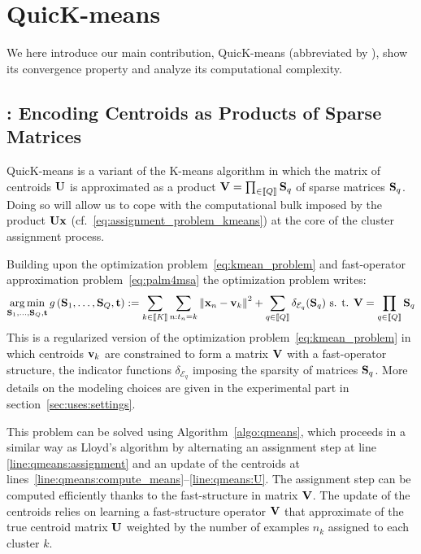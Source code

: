 
\section{QuicK-means}
\label{sec:contribution}

We here introduce our main contribution, QuicK-means (abbreviated by \qkmeans), 
show its convergence property and analyze its computational complexity.

\subsection{\qkmeans: Encoding Centroids as Products of Sparse Matrices}

QuicK-means is a variant of the K-means algorithm in which the matrix of centroids ${\mathbf{U}}$
is approximated as a product ${\mathbf{V}}=\prod_{\in\left \llbracket Q\right \rrbracket}{\mathbf{S}}_q$ of sparse matrices ${\mathbf{S}}_q$.
Doing so will allow us to cope with the computational bulk imposed by the product ${\mathbf{U}}{\mathbf{x}}$
(cf.~\eqref{eq:assignment_problem_kmeans}) at the core of the cluster assignment process.

Building upon the \kmeans optimization problem~\eqref{eq:kmean_problem} and fast-operator approximation problem~\eqref{eq:palm4msa} the \qkmeans optimization problem 
writes:
%
\begin{align}
\label{eq:qmean_problem}
 \operatorname*{arg\,min}_{{\mathbf{S}}_1, \ldots, {\mathbf{S}}_{Q}, {\mathbf{t}}} g\left({\mathbf{S}}_1, \ldots, {\mathbf{S}}_{Q}, {\mathbf{t}}\right)
    := \sum_{k\in\left \llbracket K\right \rrbracket}\sum_{n: t_n = k} \left\|{\mathbf{x}}_n -{\mathbf{v}}_k\right\|^2 + \sum_{q\in\left \llbracket Q\right \rrbracket} \delta_{\mathcal{E}_q}({\mathbf{S}}_q) \text{ s. t. } {\mathbf{V}} = \prod_{q\in\left \llbracket Q\right \rrbracket}{\mathbf{S}}_q
\end{align}
%
This is a regularized version of the \kmeans optimization problem~\eqref{eq:kmean_problem} in which centroids ${\mathbf{v}}_k$ are constrained to form a matrix ${\mathbf{V}}$ with a fast-operator structure, the indicator functions $\delta_{\mathcal{E}_q}$ imposing the sparsity of matrices ${\mathbf{S}}_q$.
More details on the modeling choices are given in the experimental part in section~\ref{sec:uses:settings}.

This problem can be solved using Algorithm~\ref{algo:qmeans},
which proceeds in a similar way as Lloyd's algorithm by alternating an assignment step at line \ref{line:qmeans:assignment} and an update of the centroids at lines~\ref{line:qmeans:compute_means}--\ref{line:qmeans:U}. The assignment step can be computed efficiently thanks to the fast-structure in matrix ${\mathbf{V}}$. The update of the centroids relies on learning a fast-structure operator ${\mathbf{V}}$ that approximate of the true centroid matrix ${\mathbf{U}}$ weighted by the number of examples $n_k$ assigned to each cluster $k$.

